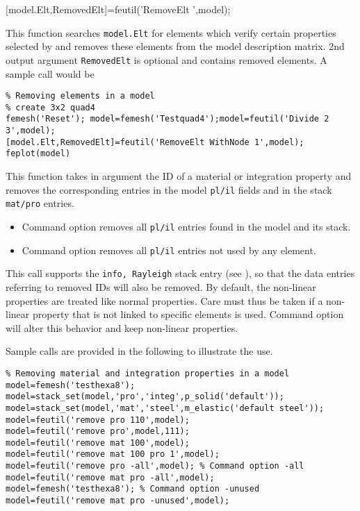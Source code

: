 [model.Elt,RemovedElt]=feutil('RemoveElt ',model);

 This function searches {\tt model.Elt} for elements which verify certain properties selected by \hyperlink{findelt}{} and removes these elements from the model description matrix. 2nd output argument {\tt RemovedElt} is optional and contains removed elements.
A sample call would be

\begin{verbatim}
% Removing elements in a model
% create 3x2 quad4 
femesh('Reset'); model=femesh('Testquad4');model=feutil('Divide 2 3',model); 
[model.Elt,RemovedElt]=feutil('RemoveElt WithNode 1',model);
feplot(model)
\end{verbatim}%


 This function takes in argument the ID of a material or integration property and removes the corresponding entries in the model {\tt pl/il} fields and in the stack {\tt mat/pro} entries.

\begin{itemize}
\item Command option  removes all {\tt pl/il} entries found in the model and its stack.
\item Command option  removes all {\tt pl/il} entries not used by any element.
\end{itemize}

\begin{SDT}
This call supports the {\tt info, Rayleigh} stack entry (see ), so that the data entries referring to removed IDs will also be removed.
By default, the non-linear properties are treated like normal properties. Care must thus be taken if a non-linear property that is not linked to specific elements is used. Command option~ will alter this behavior and keep non-linear properties.
\end{SDT}

Sample calls are provided in the following to illustrate the use.
\begin{verbatim}
% Removing material and integration properties in a model
model=femesh('testhexa8');
model=stack_set(model,'pro','integ',p_solid('default'));
model=stack_set(model,'mat','steel',m_elastic('default steel'));
model=feutil('remove pro 110',model);
model=feutil('remove pro',model,111);
model=feutil('remove mat 100',model);
model=feutil('remove mat 100 pro 1',model);
model=feutil('remove pro -all',model); % Command option -all
model=feutil('remove mat pro -all',model);
model=femesh('testhexa8'); % Command option -unused
model=feutil('remove mat pro -unused',model);
\end{verbatim}%

